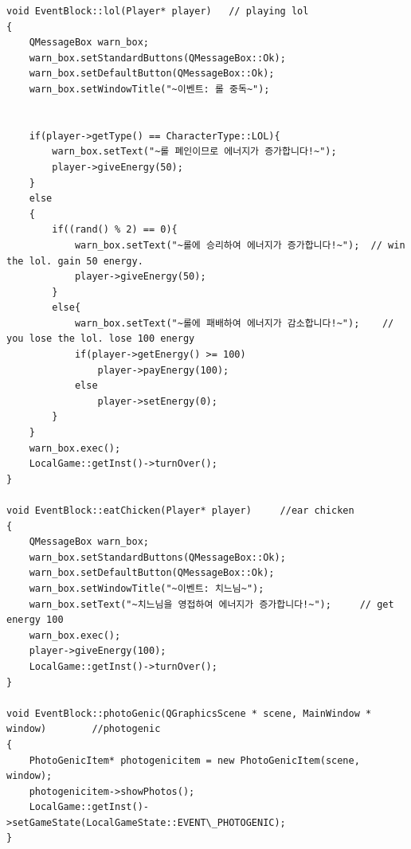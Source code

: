 \documentclass[10pt,oneside,a4paper,titlepage]{article}
\begin{document}
\begin{lstlisting}[escapeinside=~~]
void EventBlock::lol(Player* player)   // playing lol
{
    QMessageBox warn_box;
    warn_box.setStandardButtons(QMessageBox::Ok);
    warn_box.setDefaultButton(QMessageBox::Ok);
    warn_box.setWindowTitle("~이벤트: 롤 중독~");


    if(player->getType() == CharacterType::LOL){
        warn_box.setText("~롤 폐인이므로 에너지가 증가합니다!~");
        player->giveEnergy(50);
    }
    else
    {
        if((rand() % 2) == 0){
            warn_box.setText("~롤에 승리하여 에너지가 증가합니다!~");  // win the lol. gain 50 energy.
            player->giveEnergy(50);
        }
        else{
            warn_box.setText("~롤에 패배하여 에너지가 감소합니다!~");    // you lose the lol. lose 100 energy
            if(player->getEnergy() >= 100)
                player->payEnergy(100);
            else
                player->setEnergy(0);
        }
    }
    warn_box.exec();
    LocalGame::getInst()->turnOver();
}

void EventBlock::eatChicken(Player* player)     //ear chicken
{
    QMessageBox warn_box;
    warn_box.setStandardButtons(QMessageBox::Ok);
    warn_box.setDefaultButton(QMessageBox::Ok);
    warn_box.setWindowTitle("~이벤트: 치느님~");
    warn_box.setText("~치느님을 영접하여 에너지가 증가합니다!~");     // get energy 100
    warn_box.exec();
    player->giveEnergy(100);
    LocalGame::getInst()->turnOver();
}

void EventBlock::photoGenic(QGraphicsScene * scene, MainWindow * window)        //photogenic
{
    PhotoGenicItem* photogenicitem = new PhotoGenicItem(scene, window);
    photogenicitem->showPhotos();
    LocalGame::getInst()->setGameState(LocalGameState::EVENT\_PHOTOGENIC);
}
\end{lstlisting}
\end{document}

